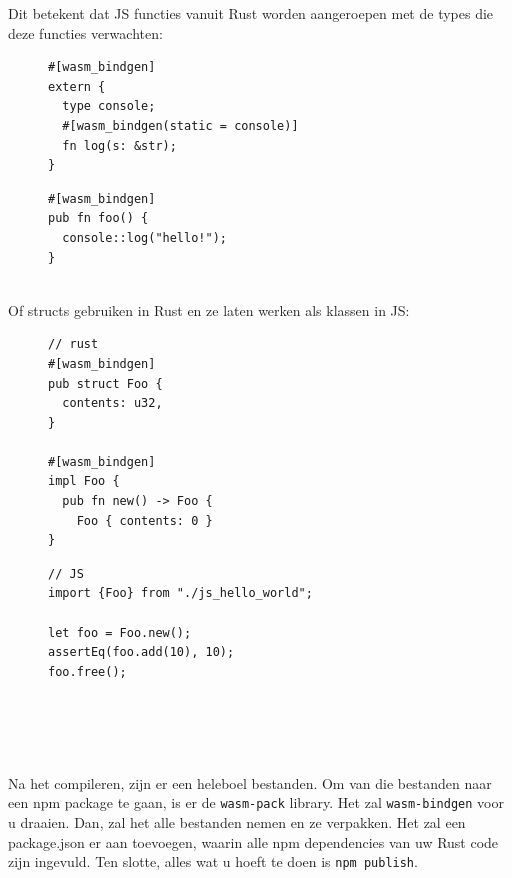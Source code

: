 \clearpage

Dit betekent dat JS functies vanuit Rust worden aangeroepen met de types die deze functies
verwachten:
\begin{figure}[h]
\begin{minipage}{.5\textwidth}
\begin{verbatim}
#[wasm_bindgen]
extern {
  type console;
  #[wasm_bindgen(static = console)]
  fn log(s: &str);
}
\end{verbatim}
\end{minipage}\hfill
\begin{minipage}{.5\textwidth}
\begin{verbatim}
#[wasm_bindgen]
pub fn foo() {
  console::log("hello!");
}


\end{verbatim}
\end{minipage}
\end{figure}

Of structs gebruiken in Rust en ze laten werken als klassen in JS:

\begin{figure}[h]
\begin{minipage}{.5\textwidth}
\begin{verbatim}
// rust
#[wasm_bindgen]
pub struct Foo {
  contents: u32,
}

#[wasm_bindgen]
impl Foo {
  pub fn new() -> Foo {
    Foo { contents: 0 }
}
\end{verbatim}
\end{minipage}\hfill
\begin{minipage}{.5\textwidth}
\begin{verbatim}
// JS
import {Foo} from "./js_hello_world";

let foo = Foo.new();
assertEq(foo.add(10), 10);
foo.free();





\end{verbatim}
\end{minipage}
\end{figure}

Na het compileren, zijn er een heleboel bestanden. Om van die bestanden naar een npm package te
gaan, is er de \texttt{wasm-pack} library. Het zal \texttt{wasm-bindgen} voor u
draaien. Dan, zal het alle bestanden nemen en ze verpakken. Het zal een package.json  er aan
toevoegen, waarin alle npm dependencies van uw Rust code zijn ingevuld. Ten slotte, alles wat u
hoeft te doen is \texttt{npm publish}.

